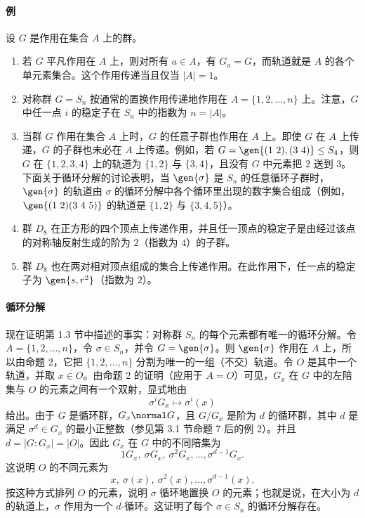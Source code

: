 \paragraph{例}
设 $G$ 是作用在集合 $A$ 上的群。
\begin{enumerate}[label=(\arabic*)]
  \item 若 $G$ 平凡作用在 $A$ 上，则对所有 $a\in A$，有 $G_a=G$，而轨道就是 $A$ 的各个单元素集合。这个作用传递当且仅当 $|A|=1$。
  \item 对称群 $G=S_n$ 按通常的置换作用传递地作用在 $A=\{1,2,\ldots,n\}$ 上。注意，$G$ 中任一点 $i$ 的稳定子在 $S_n$ 中的指数为 $n=|A|$。
  \item 当群 $G$ 作用在集合 $A$ 上时，$G$ 的任意子群也作用在 $A$ 上。即使 $G$ 在 $A$ 上传递，$G$ 的子群也未必在 $A$ 上传递。例如，若 $G=\gen{(1\ 2),(3\ 4)}\leq S_4$，则 $G$ 在 $\{1,2,3,4\}$ 上的轨道为 $\{1,2\}$ 与 $\{3,4\}$，且没有 $G$ 中元素把 $2$ 送到 $3$。下面关于循环分解的讨论表明，当 $\gen{\sigma}$ 是 $S_n$ 的任意循环子群时，$\gen{\sigma}$ 的轨道由 $\sigma$ 的循环分解中各个循环里出现的数字集合组成（例如，$\gen{(1\ 2)(3\ 4\ 5)}$ 的轨道是 $\{1,2\}$ 与 $\{3,4,5\}$）。
  \item 群 $D_8$ 在正方形的四个顶点上传递作用，并且任一顶点的稳定子是由经过该点的对称轴反射生成的阶为 $2$（指数为 $4$）的子群。
  \item 群 $D_8$ 也在两对相对顶点组成的集合上传递作用。在此作用下，任一点的稳定子为 $\gen{s,r^2}$（指数为 $2$）。
\end{enumerate}

\paragraph{循环分解}
现在证明第 1.3 节中描述的事实：对称群 $S_n$ 的每个元素都有唯一的循环分解。令 $A=\{1,2,\ldots,n\}$，令 $\sigma\in S_n$，并令 $G=\gen{\sigma}$。则 $\gen{\sigma}$ 作用在 $A$ 上，所以由命题 2，它把 $\{1,2,\ldots,n\}$ 分割为唯一的一组（不交）轨道。令 $O$ 是其中一个轨道，并取 $x\in O$。由命题 2 的证明（应用于 $A=O$）可见，$G_x$ 在 $G$ 中的左陪集与 $O$ 的元素之间有一个双射，显式地由
\[
  \sigma^iG_x\longmapsto \sigma^i(x)
\]
给出。由于 $G$ 是循环群，$G_x\normal G$，且 $G/G_x$ 是阶为 $d$ 的循环群，其中 $d$ 是满足 $\sigma^d\in G_x$ 的最小正整数（参见第 3.1 节命题 7 后的例 2）。并且 $d=|G:G_x|=|O|$。因此 $G_x$ 在 $G$ 中的不同陪集为
\[
  1G_x,\ \sigma G_x,\ \sigma^2G_x,\ldots,\sigma^{d-1}G_x.
\]
这说明 $O$ 的不同元素为
\[
  x,\ \sigma(x),\ \sigma^2(x),\ldots,\sigma^{d-1}(x).
\]
按这种方式排列 $O$ 的元素，说明 $\sigma$ 循环地置换 $O$ 的元素；也就是说，在大小为 $d$ 的轨道上，$\sigma$ 作用为一个 $d$-循环。这证明了每个 $\sigma\in S_n$ 的循环分解存在。

